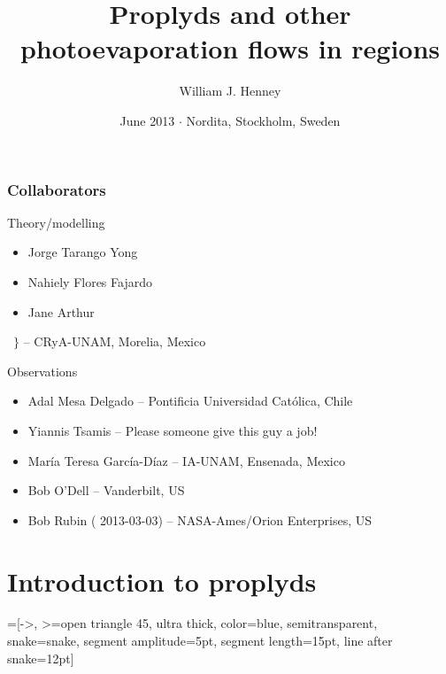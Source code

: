 \documentclass[presentation]{beamer}
\title[Proplyds and friends]{Proplyds and other photoevaporation flows in \hii{} regions}
\author{William J. Henney}
\date[Nordita 2013]{June 2013 \(\cdot\) Nordita, Stockholm, Sweden}
\institute[CRyA, UNAM]
{
  \structure{Centro de Radioastronomía y Astrofísica\\
  UNAM, Morelia, México}
}
\begin{document}
\maketitle

\centering 


\begin{frame}
\frametitle{Collaborators}
\begin{block}{Theory/modelling}
  \parbox{11em}{
  \begin{itemize}
  \item Jorge Tarango Yong
  \item Nahiely Flores Fajardo
  \item Jane Arthur
  \end{itemize}
  }~{\LARGE \(\biggr\}\)}  -- CRyA-UNAM, Morelia, Mexico
\end{block}

\begin{block}{Observations}
  \begin{itemize}
  \item Adal Mesa Delgado -- Pontificia Universidad Católica, Chile
  \item Yiannis Tsamis -- \alert{Please someone give this guy a job!}
  \item María Teresa García-Díaz -- IA-UNAM, Ensenada, Mexico
  \item Bob O'Dell -- Vanderbilt, US
  \item Bob Rubin (\textdagger{} 2013-03-03) -- NASA-Ames/Orion Enterprises, US
  \end{itemize}

\end{block}
\end{frame}

\section{Introduction to proplyds}

=[->, >=open triangle 45,
ultra thick,  color=blue, semitransparent, 
snake=snake, 
segment amplitude=5pt, 
segment length=15pt,
line after snake=12pt]
\end{document}
